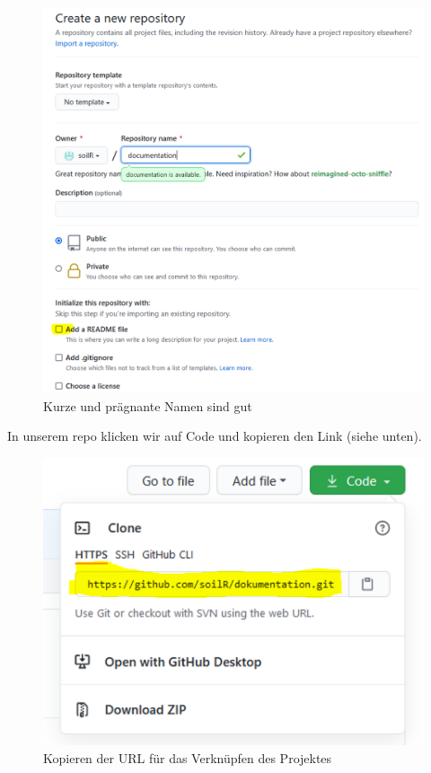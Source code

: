 \documentclass[
]{article}
\begin{document}
\begin{figure}

{\centering \includegraphics[width=1\linewidth]{images/078} 

}

\caption{Kurze und prägnante Namen sind gut}\label{fig:unnamed-chunk-300}
\end{figure}

In unserem repo klicken wir auf Code und kopieren den Link (siehe unten).

\begin{figure}

{\centering \includegraphics[width=1\linewidth]{images/068} 

}

\caption{Kopieren der URL für das Verknüpfen des Projektes}\label{fig:unnamed-chunk-301}
\end{figure}
\end{document}
